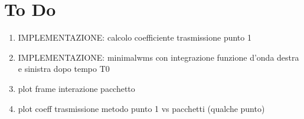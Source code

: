 \section*{To Do}
\begin{enumerate}
\item IMPLEMENTAZIONE: calcolo coefficiente trasmissione punto 1
\item IMPLEMENTAZIONE: minimalwms con integrazione funzione d'onda destra e sinistra
dopo tempo T0
\item plot frame interazione pacchetto
\item plot coeff trasmissione metodo punto 1 vs pacchetti (qualche punto)
\end{enumerate}
\newpage
